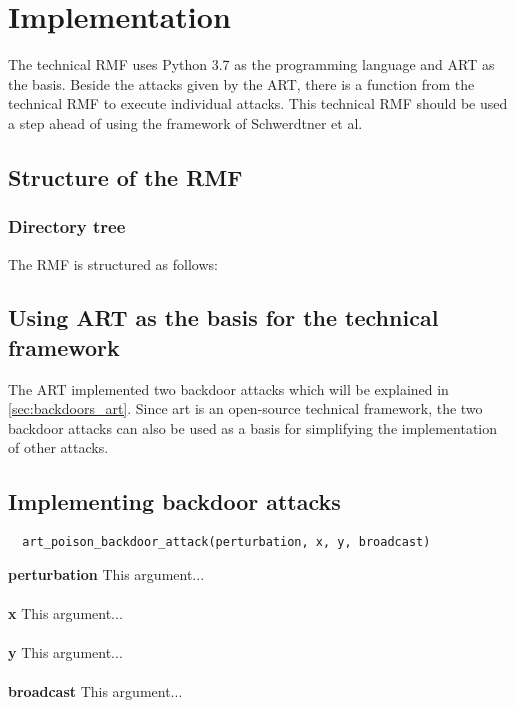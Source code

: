 \section{Implementation}
\label{sec:implementation}

The technical RMF uses Python 3.7 as the programming language and ART as the basis. Beside the attacks given by the ART, there is a function from the technical RMF to execute individual attacks. This technical RMF should be used a step ahead of using the framework of Schwerdtner et al.

\subsection{Structure of the RMF}

\subsubsection*{Directory tree}

The RMF is structured as follows:


\subsection{Using ART as the basis for the technical framework}

The ART implemented two backdoor attacks which will be explained in \ref{sec:backdoors_art}. Since art is an open-source technical framework, the two backdoor attacks can also be used as a basis for simplifying the implementation of other attacks.

\subsection{Implementing backdoor attacks}

\begin{lstlisting}
  art_poison_backdoor_attack(perturbation, x, y, broadcast)
\end{lstlisting}

\noindent\textbf{perturbation}
This argument... \\ \\
\textbf{x}
This argument... \\ \\
\textbf{y}
This argument... \\ \\
\textbf{broadcast}
This argument... \\ \\

